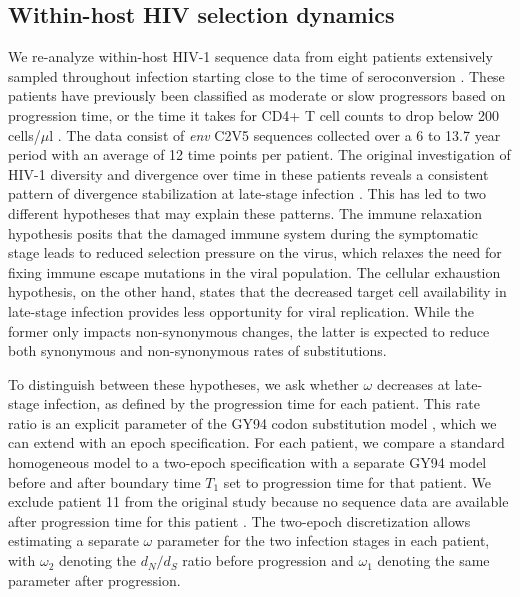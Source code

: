 \subsection{Within-host HIV selection dynamics}

We re-analyze within-host HIV-1 sequence data from eight patients extensively sampled throughout infection starting close to the time of seroconversion \citep{Shankarappa1999}.
These patients have previously been classified as moderate or slow progressors based on progression time, or the time it takes for CD4+ T cell counts to drop below 200 cells/$\mu$l \citep{williamson2003}.
The data consist of \textit{env} C2V5 sequences collected over a 6 to 13.7 year period with an average of 12 time points per patient. %
The original investigation of HIV-1 diversity and divergence over time in these patients reveals a consistent pattern of divergence stabilization at late-stage infection \citep{Shankarappa1999}.
This has led to two different hypotheses that may explain these patterns.
The immune relaxation hypothesis posits that the damaged immune system during the symptomatic stage leads to reduced selection pressure on the virus, which relaxes the need for fixing immune escape mutations in the viral population.
The cellular exhaustion hypothesis, on the other hand, states that the decreased target cell availability  in late-stage infection provides less opportunity for viral replication. While the former only impacts non-synonymous changes, the latter is expected to reduce both synonymous and non-synonymous rates of substitutions.

To distinguish between these hypotheses, we ask whether $\omega$
decreases at late-stage infection, as defined by the progression time for each patient. 
This rate ratio is an explicit parameter of the GY94 codon substitution model \citep{Goldman1994}, which we can extend with an epoch specification.  
For each patient, we compare a standard homogeneous model to a two-epoch specification with a separate GY94 model before and after boundary time $T_{1}$ set to progression time for that patient.
We exclude patient 11 from the original study because no sequence data are available after progression time for this patient \citep{Shankarappa1999}.
The two-epoch discretization allows estimating a separate $\omega$ parameter for the two infection stages in each patient, with $\omega_{2}$ denoting the $d_N/d_S$ ratio before progression and $\omega_{1}$ denoting the same parameter after progression.

